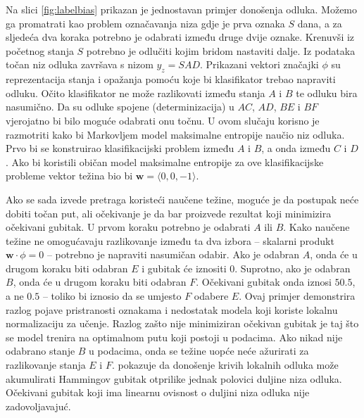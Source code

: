 Na slici \ref{fig:labelbias} prikazan je jednostavan primjer donošenja odluka.
Možemo ga promatrati kao problem označavanja niza gdje je prva oznaka $S$ dana,
a za sljedeća dva koraka potrebno je odabrati između druge dvije oznake.
Krenuvši iz početnog stanja $S$ potrebno je odlučiti kojim bridom nastaviti
dalje. Iz podataka točan niz odluka završava s nizom $y_z = SAD$. Prikazani
vektori značajki $\phi$ su reprezentacija stanja i opažanja pomoću koje bi
klasifikator trebao napraviti odluku. Očito klasifikator ne može razlikovati
između stanja $A$ i $B$ te odluku bira nasumično. Da su odluke spojene
(determinizacija) u $AC$, $AD$, $BE$ i $BF$ vjerojatno bi bilo moguće odabrati
onu točnu. U ovom slučaju korisno je razmotriti kako bi Markovljem model
maksimalne entropije naučio niz odluka. Prvo bi se konstruirao klasifikacijski
problem između $A$ i $B$, a onda između $C$ i $D$. Ako bi koristili običan model
maksimalne entropije za ove klasifikacijske probleme vektor težina bio bi
$\mathbf{w} = \langle 0,0,-1 \rangle$.

Ako se sada izvede pretraga koristeći naučene težine, moguće je da postupak neće
dobiti točan put, ali očekivanje je da bar proizvede rezultat koji minimizira
očekivani gubitak. U prvom koraku potrebno je odabrati $A$ ili $B$. Kako naučene
težine ne omogućavaju razlikovanje između ta dva izbora -- skalarni produkt
$\mathbf{w} \cdot \phi = 0$ -- potrebno je napraviti nasumičan odabir. Ako je
odabran $A$, onda će u drugom koraku biti odabran $E$ i gubitak će iznositi 0.
Suprotno, ako je odabran $B$, onda će u drugom koraku biti odabran $F$.
Očekivani gubitak onda iznosi $50.5$, a ne $0.5$ -- toliko bi iznosio da se
umjesto $F$ odabere $E$. Ovaj primjer demonstrira razlog pojave pristranosti
oznakama i nedostatak modela koji koriste lokalnu normalizaciju za učenje.
Razlog zašto nije minimiziran očekivan gubitak je taj što se model trenira na
optimalnom putu koji postoji u podacima. Ako nikad nije odabrano stanje $B$ u
podacima, onda se težine uopće neće ažurirati za razlikovanje stanja $E$ i $F$.
\citet{kaariainen2006lower} pokazuje da donošenje krivih lokalnih odluka može
akumulirati Hammingov gubitak otprilike jednak polovici duljine niza odluka.
Očekivani gubitak koji ima linearnu ovisnost o duljini niza odluka nije
zadovoljavajuć.

